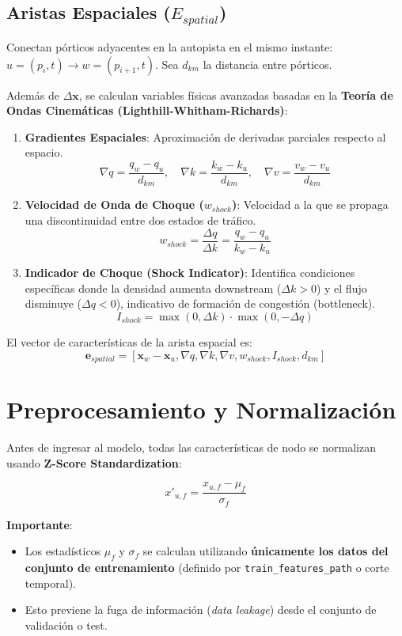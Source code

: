 \documentclass{article}
\begin{document}
\subsection{Aristas Espaciales ($E_{spatial}$)}
Conectan pórticos adyacentes en la autopista en el mismo instante: $u=(p_i, t) \to w=(p_{i+1}, t)$. Sea $d_{km}$ la distancia entre pórticos.

Además de $\Delta \mathbf{x}$, se calculan variables físicas avanzadas basadas en la \textbf{Teoría de Ondas Cinemáticas (Lighthill-Whitham-Richards)}:

\begin{enumerate}
    \item \textbf{Gradientes Espaciales}:
    Aproximación de derivadas parciales respecto al espacio.
    \[ \nabla q = \frac{q_w - q_u}{d_{km}}, \quad \nabla k = \frac{k_w - k_u}{d_{km}}, \quad \nabla v = \frac{v_w - v_u}{d_{km}} \]

    \item \textbf{Velocidad de Onda de Choque ($w_{shock}$)}:
    Velocidad a la que se propaga una discontinuidad entre dos estados de tráfico.
    \[ w_{shock} = \frac{\Delta q}{\Delta k} = \frac{q_w - q_u}{k_w - k_u} \]

    \item \textbf{Indicador de Choque (Shock Indicator)}:
    Identifica condiciones específicas donde la densidad aumenta downstream ($\Delta k > 0$) y el flujo disminuye ($\Delta q < 0$), indicativo de formación de congestión (bottleneck).
    \[ I_{shock} = \max(0, \Delta k) \cdot \max(0, -\Delta q) \]
\end{enumerate}

El vector de características de la arista espacial es:
\[ \mathbf{e}_{spatial} = [\mathbf{x}_w - \mathbf{x}_u, \nabla q, \nabla k, \nabla v, w_{shock}, I_{shock}, d_{km}] \]

\section{Preprocesamiento y Normalización}
Antes de ingresar al modelo, todas las características de nodo se normalizan usando \textbf{Z-Score Standardization}:

\[ x'_{u,f} = \frac{x_{u,f} - \mu_f}{\sigma_f} \]

\textbf{Importante}:
\begin{itemize}
    \item Los estadísticos $\mu_f$ y $\sigma_f$ se calculan utilizando \textbf{únicamente los datos del conjunto de entrenamiento} (definido por \texttt{train\_features\_path} o corte temporal).
    \item Esto previene la fuga de información (\textit{data leakage}) desde el conjunto de validación o test.
\end{itemize}
\end{document}
